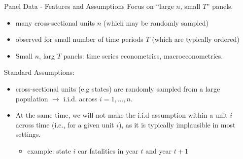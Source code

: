 \documentclass[9pt,aspectratio=169]{beamer}
\begin{document}
\begin{frame}{Panel Data - Features and Assumptions}
Focus on “large $n$, small $T$” panels.
\begin{itemize}
    \item many cross-sectional units $n$ (which may be randomly sampled) 
    \item observed for small number of time periods $T$ (which are typically ordered) \pause
    \item[$\rightarrow$] Small $n$, larg $T$ panels: time series econometrics, macroeconometrics. 
\end{itemize} 
\pause
\medskip 
Standard Assumptions:
\begin{itemize}
    \item cross-sectional units (e.g states) are \alert{randomly} sampled from a large population $\rightarrow$ i.i.d. across $i = 1, ... , n$.
    \item At the same time, we will \alert{not} make the i.i.d assumption within a unit $i$ across time (i.e., for a given unit $i$), as it is typically implausible in most settings.
    \small 
    \begin{itemize}
        \item example: state $i$ car fatalities in year $t$ and year $t+1$ 
    \end{itemize} 
\end{itemize}
\end{frame}
\end{document}
